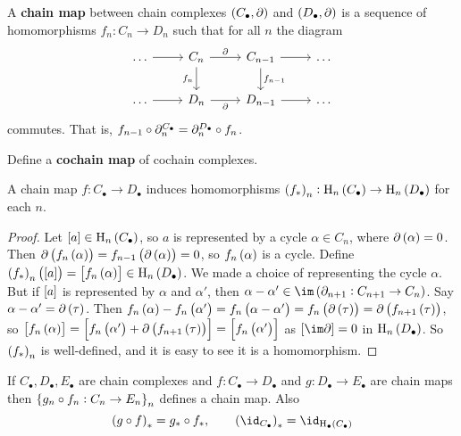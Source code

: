 \begin{definition*}
A \textbf{chain map} between chain complexes $ \br{C_\bullet, \da} $ and $ \br{D_\bullet, \da} $ is a sequence of homomorphisms $ f_n : C_n \to D_n $ such that for all $ n $ the diagram
$$
\begin{tikzcd}
\dots \arrow{r} & C_n \arrow{r}{\da} \arrow{d}[swap]{f_n} & C_{n - 1} \arrow{r} \arrow{d}{f_{n - 1}} & \dots \\
\dots \arrow{r} & D_n \arrow{r}[swap]{\da} & D_{n - 1} \arrow{r} & \dots
\end{tikzcd}
$$
commutes. That is, $ f_{n - 1} \circ \partial_n^{C_\bullet} = \partial_n^{D_\bullet} \circ f_n $.
\end{definition*}

\begin{exercise*}
Define a \textbf{cochain map} of cochain complexes.
\end{exercise*}

\begin{lemma}
A chain map $ f : C_\bullet \to D_\bullet $ induces homomorphisms $ \br{f_*}_n : \H_n\br{C_\bullet} \to \H_n\br{D_\bullet} $ for each $ n $.
\end{lemma}

\begin{proof}
Let $ \sbr{a} \in \H_n\br{C_\bullet} $, so $ a $ is represented by a cycle $ \alpha \in C_n $, where $ \da\br{\alpha} = 0 $. Then $ \da\br{f_n\br{\alpha}} = f_{n - 1}\br{\da\br{\alpha}} = 0 $, so $ f_n\br{\alpha} $ is a cycle. Define $ \br{f_*}_n\br{\sbr{a}} = \sbr{f_n\br{\alpha}} \in \H_n\br{D_\bullet} $. We made a choice of representing the cycle $ \alpha $. But if $ \sbr{a} $ is represented by $ \alpha $ and $ \alpha' $, then $ \alpha - \alpha' \in \im \br{\da_{n + 1} : C_{n + 1} \to C_n} $. Say $ \alpha - \alpha' = \da\br{\tau} $. Then $ f_n\br{\alpha} - f_n\br{\alpha'} = f_n\br{\alpha - \alpha'} = f_n\br{\da\br{\tau}} = \da\br{f_{n + 1}\br{\tau}} $, so $ \sbr{f_n\br{\alpha}} = \sbr{f_n\br{\alpha'} + \da\br{f_{n + 1}\br{\tau}}} = \sbr{f_n\br{\alpha'}} $ as $ \sbr{\im \da} = 0 $ in $ \H_n\br{D_\bullet} $. So $ \br{f_*}_n $ is well-defined, and it is easy to see it is a homomorphism.
\end{proof}

\begin{exercise*}
If $ C_\bullet, D_\bullet, E_\bullet $ are chain complexes and $ f : C_\bullet \to D_\bullet $ and $ g : D_\bullet \to E_\bullet $ are chain maps then $ \cbr{g_n \circ f_n : C_n \to E_n}_n $ defines a chain map. Also
\begin{equation}
\label{eq:1}
\br{g \circ f}_* = g_* \circ f_*, \qquad \br{\id_{C_\bullet}}_* = \id_{\H_\bullet\br{C_\bullet}}
\end{equation}
\end{exercise*}

